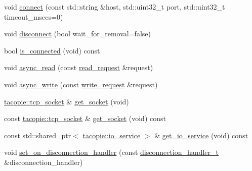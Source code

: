 \begin{DoxyCompactItemize}
\item 
void \hyperlink{classtacopie_1_1tcp__client_a0cfbb18cb72aa3b6a41921f61cacc425}{connect} (const std\+::string \&host, std\+::uint32\+\_\+t port, std\+::uint32\+\_\+t timeout\+\_\+msecs=0)
\item 
void \hyperlink{classtacopie_1_1tcp__client_a7562e0bfa24912595d6f695f848b9e51}{disconnect} (bool wait\+\_\+for\+\_\+removal=false)
\item 
bool \hyperlink{classtacopie_1_1tcp__client_a9bf568812c8350260843842e7952c8c3}{is\+\_\+connected} (void) const
\item 
void \hyperlink{classtacopie_1_1tcp__client_a120e3ec2902acc902f7a0b27074bda6b}{async\+\_\+read} (const \hyperlink{structtacopie_1_1tcp__client_1_1read__request}{read\+\_\+request} \&request)
\item 
void \hyperlink{classtacopie_1_1tcp__client_a2304ed6d4ca0cbc74e6aa72d3e92b76a}{async\+\_\+write} (const \hyperlink{structtacopie_1_1tcp__client_1_1write__request}{write\+\_\+request} \&request)
\item 
\hyperlink{classtacopie_1_1tcp__socket}{tacopie\+::tcp\+\_\+socket} \& \hyperlink{classtacopie_1_1tcp__client_a1a3834deb1d263ec5816066f74286298}{get\+\_\+socket} (void)
\item 
const \hyperlink{classtacopie_1_1tcp__socket}{tacopie\+::tcp\+\_\+socket} \& \hyperlink{classtacopie_1_1tcp__client_a9cf1f3ccf43f9a0a883a17b15e3668d6}{get\+\_\+socket} (void) const
\item 
const std\+::shared\+\_\+ptr$<$ \hyperlink{classtacopie_1_1io__service}{tacopie\+::io\+\_\+service} $>$ \& \hyperlink{classtacopie_1_1tcp__client_aafbf0aa37cd0472778d09fb163362314}{get\+\_\+io\+\_\+service} (void) const
\item 
void \hyperlink{classtacopie_1_1tcp__client_a8c290d681186edb0578051c04f3c0762}{set\+\_\+on\+\_\+disconnection\+\_\+handler} (const \hyperlink{classtacopie_1_1tcp__client_aca5df52e5ee6fa673cf212532ada1453}{disconnection\+\_\+handler\+\_\+t} \&disconnection\+\_\+handler)
\end{DoxyCompactItemize}
